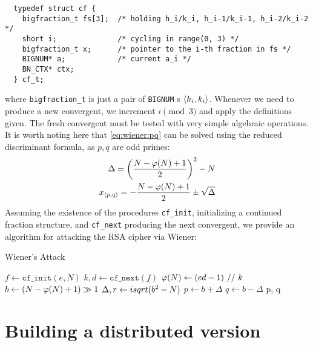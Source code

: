 \begin{verbatim}
  typedef struct cf {
    bigfraction_t fs[3];  /* holding h_i/k_i, h_i-1/k_i-1, h_i-2/k_i-2 */
    short i;              /* cycling in range(0, 3) */
    bigfraction_t x;      /* pointer to the i-th fraction in fs */
    BIGNUM* a;            /* current a_i */
    BN_CTX* ctx;
  } cf_t;
\end{verbatim}
where \texttt{bigfraction\_t} is just a pair of \texttt{BIGNUM} \!s
$\langle h_i, k_i\rangle$. Whenever we need to produce a new convergent, we increment
$i \pmod{3}$ and apply the definitions given. The fresh convergent must be
tested with very simple algebraic operations. It is worth noting here that
\ref{eq:wiener:pq} can be solved using the reduced discriminant formula, as
$p, q$ are odd primes:
\begin{align*}
\Delta = \left( \frac{N-\varphi(N) + 1}{2} \right)^2 - N \\
x_{\langle p , q\rangle} = - \frac{N - \varphi(N) + 1}{2} \pm \sqrt{\Delta}
\end{align*}
Assuming the existence of the procedures \texttt{cf\_init}, initializing a
continued fraction structure, and \texttt{cf\_next} producing the next
convergent, we provide an algorithm for attacking the RSA cipher via Wiener:

\begin{algorithm}[H]
  \caption{Wiener's Attack}
  \label{alg:wiener}
  \begin{algorithmic}[1]
    \State $f \gets  \texttt{cf\_init}(e, N)$
      \State $k, d \gets \texttt{cf\_next}(f)$
        \EndIf
      \State $\varphi(N) \gets (ed - 1)\ //\ k$
        \EndIf
      \State $b \gets (N - \varphi(N) + 1) \gg 1$
      \State $\Delta, r \gets isqrt(b^2 - N)$
        \EndIf
      \State $p \gets b + \Delta$
      \State $q \gets b - \Delta$
      \State {}
    \EndFor
    \State \Return p, q
    \EndFunction
  \end{algorithmic}
\end{algorithm}

\section{Building a distributed version}

